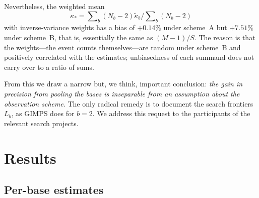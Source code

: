 \documentclass[11pt,a4paper]{article}
\theoremstyle{plain}
\theoremstyle{remark}
\begin{document}
Nevertheless, the weighted mean
$$\kappa_\ast=\sum\nolimits_b(N_b-2)\tilde\kappa_b\Big/\sum\nolimits_b(N_b-2)$$
with inverse-variance weights has a bias of $+0.14\%$ under scheme~A but
$+7.51\%$ under scheme~B, that is, essentially the same as $(M-1)/S$. The reason
is that the weights---the event counts themselves---are random under scheme~B
and positively correlated with the estimates; unbiasedness of each summand does
not carry over to a ratio of sums.

From this we draw a narrow but, we think, important conclusion: \emph{the gain
in precision from pooling the bases is inseparable from an assumption about the
observation scheme}. The only radical remedy is to document the search frontiers
$L_b$, as GIMPS does for $b=2$. We address this request to the participants of
the relevant search projects.

\section{Results}\label{sec:results}

\subsection{Per-base estimates}
\end{document}
